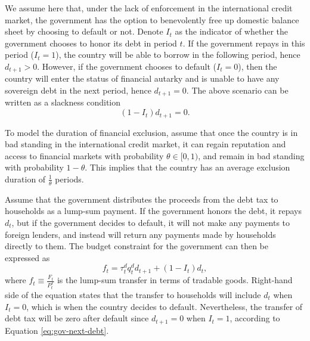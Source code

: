 We assume here that, under the lack of enforcement in the international credit market, the government has the option to benevolently free up domestic balance sheet by choosing to default or not.
Denote $I_t$ as the indicator of whether the government chooses to honor its debt in period $t$. If the government repays in this period ($I_{t} = 1$), the country will be able to borrow in the following period, hence $d_{t+1} > 0$. However, if the government chooses to default ($I_t = 0$), then the country will enter the status of financial autarky and is unable to have any sovereign debt in the next period, hence $d_{t+1} = 0$. The above scenario can be written as a slackness condition
\begin{equation}
    \label{eq:gov-next-debt}
    (1 - I_t)d_{t+1} = 0 .
\end{equation}

To model the duration of financial exclusion, assume that once the country is in bad standing in the international credit market, it can regain reputation and access to financial markets with probability $\theta \in [0,1)$, and remain in bad standing with probability $1-\theta$. This implies that the country has an average exclusion duration of $\frac{1}{\theta}$ periods\footnotemark{}.

Assume that the government distributes the proceeds from the debt tax to households as a lump-sum payment. If the government honors the debt, it repays $d_t$, but if the government decides to default, it will not make any payments to foreign lenders, and instead will return any payments made by households directly to them. The budget constraint for the government can then be expressed as
\begin{equation}
    \label{eq:gov-budget}
    f_t = \tau_t^d q_t^d d_{t+1} + (1-I_t)d_t,
\end{equation}
where $f_t \equiv \frac{F_t}{P^T_t}$ is the lump-sum transfer in terms of tradable goods. Right-hand side of the equation states that the transfer to households will include $d_t$ when $I_t = 0$, which is when the country decides to default. Nevertheless, the transfer of debt tax will be zero after default since $d_{t+1} = 0$ when $I_t = 1$, according to Equation \eqref{eq:gov-next-debt}.